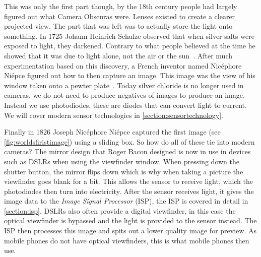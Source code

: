 This was only the first part though, by the 18th century people had largely
figured out what Camera Obscuras were. Lenses existed to create a clearer
projected view. The part that was left was to actually store the light onto
something. In 1725 Johann Heinrich Schulze observed that when silver salts
were exposed to light, they darkened. Contrary to what people believed at the
time he showed that it was due to light alone, not the air or the
sun~\cite{gernsheim1986concise}. After much experimentation based on this
discovery, a French inventor named Nic\'ephore Ni\'epce figured out how to
then capture an image. This image was the view of his window taken onto a
pewter plate~\cite{gernsheim1986concise}. Today silver chloride is no longer
used in cameras, we do not need to produce negatives of images to produce an
image. Instead we use photodiodes, these are diodes that can convert light to
current. We will cover modern sensor technologies in \cref{section:sensortechnology}.

Finally in 1826 Joseph Nic\'ephore Ni\'epce captured the first image (see
\cref{fig:worldsfiristimage}) using a sliding box. So how do all of these tie
into modern cameras? The mirror design that Roger Bacon designed is now in use
in devices such as DSLRs when using the viewfinder window. When pressing down
the shutter button, the mirror flips down which is why when taking a picture the
viewfinder goes blank for a bit. This allows the sensor to receive light, which
the photodiodes then turn into electricity. After the sensor receives light, it
gives the image data to the \textit{Image Signal Processor} (ISP), the ISP is
covered in detail in \cref{section:isp}. DSLRs also often provide a digital
viewfinder, in this case the optical viewfinder is bypassed and the light is
provided to the sensor instead. The ISP then processes this image and spits out
a lower quality image for preview. As mobile phones do not have optical
viewfinders, this is what mobile phones then use.

